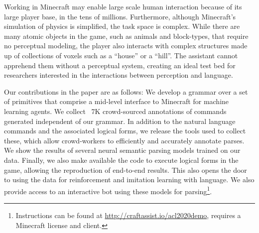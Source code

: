 Working in Minecraft may enable large scale human interaction because of its large player base, in the tens of millions. 
Furthermore, although Minecraft's simulation of physics is simplified, the task space is complex. 
While there are many atomic objects in the game, such as animals and block-types, that require no perceptual modeling, the player also interacts with complex structures made up of collections of voxels such as a ``house'' or a ``hill''. The assistant cannot apprehend them without a perceptual system, creating an ideal test bed for researchers interested in the interactions between perception and language. 

Our contributions in the paper are as follows:
\newline
{} We develop a grammar over a set of primitives that comprise a mid-level interface to Minecraft for machine learning agents.  %
\newline 
{} %
We collect ~7K  crowd-sourced annotations of commands generated independent of our grammar. %
In addition to the natural language commands and the associated logical forms, we release the tools used to collect these, which allow crowd-workers to efficiently and accurately annotate parses.%
\newline   
{} We show the results of several neural semantic parsing models trained on our data. %
\newline   
{} Finally, we also make available the code to execute logical forms in the game, allowing the reproduction of end-to-end results.  This also opens the door to using the data for reinforcement and imitation learning with language.
We also provide access to an interactive bot using these models for parsing\footnote{Instructions can be found at \url{http://craftassist.io/acl2020demo}, requires a Minecraft license and client.}. %

